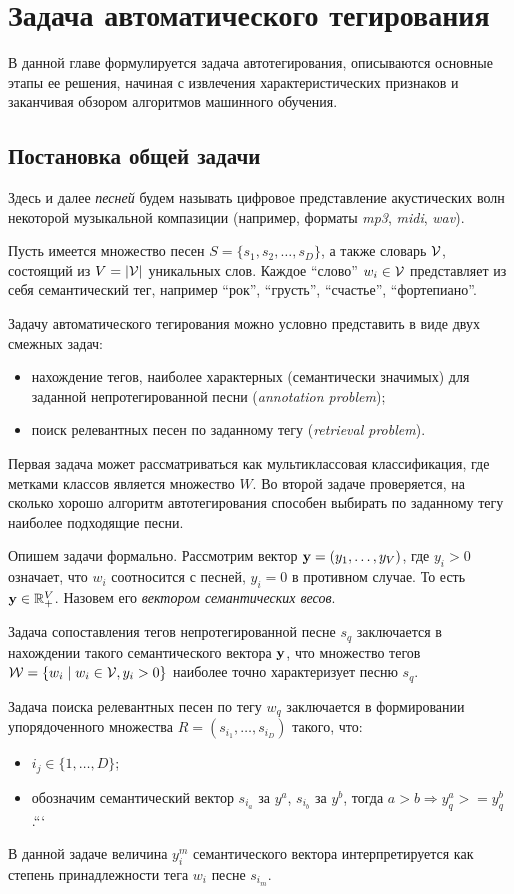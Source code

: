 \chapter{Задача автоматического тегирования}
\label{chapter1}

В данной главе формулируется задача автотегирования, описываются основные этапы ее решения, 
начиная с извлечения характеристических признаков и заканчивая обзором алгоритмов машинного обучения.

\section{Постановка общей задачи}
Здесь и далее \emph{песней} будем называть цифровое представление акустических волн некоторой музыкальной компазиции (например, форматы \emph{mp3}, \emph{midi}, \emph{wav}).

Пусть имеется множество песен $S = \{s_1, s_2, \ldots, s_D \}$, а также словарь $ \mathcal{V} $, состоящий из $V = |\mathcal{V}| $ уникальных слов. 
Каждое ``слово'' $w_i \in \mathcal{V}$ представляет из себя семантический тег, например ``рок'', ``грусть'', ``счастье'', ``фортепиано''.

Задачу автоматического тегирования можно условно представить в виде двух смежных задач: 
\begin{itemize}
 \item нахождение тегов, наиболее характерных (семантически значимых) для заданной непротегированной песни (\emph{annotation problem});
 \item поиск релевантных песен по заданному тегу (\emph{retrieval problem}).
\end{itemize}

Первая задача может рассматриваться как мультиклассовая классификация, где метками классов является множество $W$.
Во второй задаче проверяется, на сколько хорошо алгоритм автотегирования способен выбирать по заданному тегу наиболее подходящие песни.

Опишем задачи формально.
Рассмотрим вектор $\mathbf{y} = (y_1, \ldots, y_V)$, где $y_i > 0$ означает, что $w_i$ соотносится с песней, $y_i = 0$ в противном случае. То есть $\mathbf{y} \in \mathbb{R}^{V}_{+}$.
Назовем его \emph{вектором семантических весов}.

Задача сопоставления тегов непротегированной песне $s_q$ заключается в нахождении такого семантического вектора $\mathbf{y}$, 
что множество тегов $\mathcal{W} = \{w_i \mid w_i \in \mathcal{V}, y_i > 0\}$ наиболее точно характеризует песню $s_q$.

Задача поиска релевантных песен по тегу $w_q$ заключается в формировании упорядоченного множества $R = (s_{i_1}, \ldots, s_{i_D})$ такого, что:
\begin{itemize}
 \item $i_j \in \{1, \ldots, D \}$;
 \item обозначим семантический вектор $s_{i_a}$ за $y^a$, $s_{i_b}$ \ld за $y^b$, тогда $a > b \Rightarrow y^a_q >= y^b_q $.```
\end{itemize}
В данной задаче величина $y^m_i$ семантического вектора интерпретируется как степень принадлежности тега $w_i$ песне $s_{i_m}$. 
 
